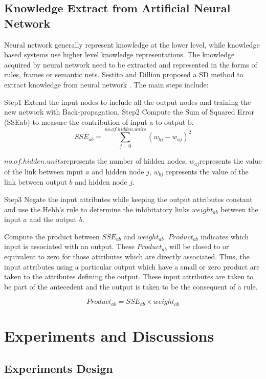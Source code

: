 \documentclass{elsarticle}
\begin{document}
\subsection{Knowledge Extract from Artificial Neural Network }
\label{sec:knowl-extr-from}

Neural network generally represent knowledge at the lower level, while
knowledge based systems use higher level knowledge
representations. The knowledge acquired by neural network need to be
extracted and represented in the forms of rules, frames or semantic
nets. Sestito and Dillion proposed a SD method to extract knowledge
from neural network \cite{Sestito1991,130346}. The main steps include:

Step1 Extend the input nodes to include all the output nodes and training the new network with Back-propagation.
Step2 Compute the Sum of Squared Error (SSEab) to measure the contribution of input a to output b.
\[SSE_{ab} = \sum_{j=0}^{no.of.hidden.units}{(w_{bj}-w_{aj})}^2\]

$no.of.hidden.units$represents the number of hidden nodes,
$w_{aj}$represents the value of the link between input $a$ and hidden
node $j$, $w_{bj}$ represents the value of the link between output $b$
and hidden node $j$.

Step3 Negate the input attributes while keeping the output attributes
constant and use the Hebb’s rule to determine the inhibitatory links
$weight_{ab}$ between the input $a$ and the output $b$.

Compute the product between $SSE_{ab}$ and
$weight_{ab}$. $Product_{ab}$ indicates which input is associated with
an output. These $Product_{ab}$ will be closed to or equivalent to
zero for those attributes which are directly associated. Thus, the
input attributes using a particular output which have a small or zero
product are taken to the attributes defining the output. These input
attributes are taken to be part of the antecedent and the output is
taken to be the consequent of a rule. 

\[Product_{ab} = SSE_{ab}\times weight_{ab}\]

\section{Experiments and Discussions }
\label{sec:exper-disc-}

\subsection{Experiments Design
}
\label{sec:experiments-design-}
\end{document}
